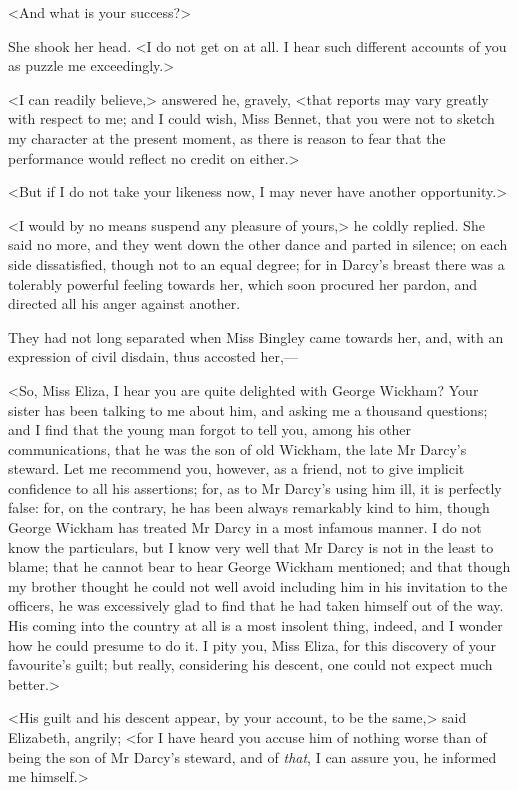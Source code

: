 <And what is your success?>

She shook her head. <I do not get on at all. I hear such different accounts of you as puzzle me exceedingly.>

<I can readily believe,> answered he, gravely, <that reports may vary greatly with respect to me; and I could wish, Miss Bennet, that you were not to sketch my character at the present moment, as there is reason to fear that the performance would reflect no credit on either.>

<But if I do not take your likeness now, I may never have another opportunity.>

<I would by no means suspend any pleasure of yours,> he coldly replied. She said no more, and they went down the other dance and parted in silence; on each side dissatisfied, though not to an equal degree; for in Darcy's breast there was a tolerably powerful feeling towards her, which soon procured her pardon, and directed all his anger against another.

They had not long separated when Miss Bingley came towards her, and, with an expression of civil disdain, thus accosted her,—

<So, Miss Eliza, I hear you are quite delighted with George Wickham? Your sister has been talking to me about him, and asking me a thousand questions; and I find that the young man forgot to tell you, among his other communications, that he was the son of old Wickham, the late Mr Darcy's steward. Let me recommend you, however, as a friend, not to give implicit confidence to all his assertions; for, as to Mr Darcy's using him ill, it is perfectly false: for, on the contrary, he has been always remarkably kind to him, though George Wickham has treated Mr Darcy in a most infamous manner. I do not know the particulars, but I know very well that Mr Darcy is not in the least to blame; that he cannot bear to hear George Wickham mentioned; and that though my brother thought he could not well avoid including him in his invitation to the officers, he was excessively glad to find that he had taken himself out of the way. His coming into the country at all is a most insolent thing, indeed, and I wonder how he could presume to do it. I pity you, Miss Eliza, for this discovery of your favourite's guilt; but really, considering his descent, one could not expect much better.>

<His guilt and his descent appear, by your account, to be the same,> said Elizabeth, angrily; <for I have heard you accuse him of nothing worse than of being the son of Mr Darcy's steward, and of \textit{that}, I can assure you, he informed me himself.>

